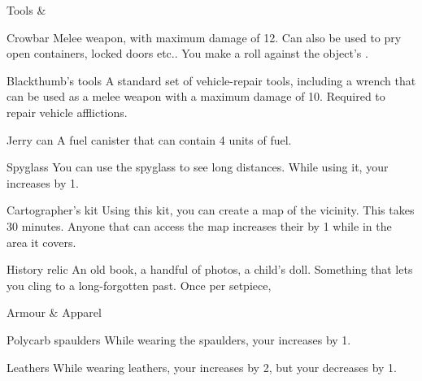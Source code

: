 \begin{abstractsection}{Tools \& }
\vspace{1ex}

\begin{describe}{Crowbar}
  Melee weapon, with maximum damage of 12. Can also be used to pry open containers, locked doors etc.. You make a  roll against the object's .
\end{describe}

\begin{describe}{Blackthumb's tools}
  A standard set of vehicle-repair tools, including a wrench that can be used as a melee weapon with a maximum damage of 10. Required to repair vehicle afflictions.
\end{describe}

\begin{describe}{Jerry can}
  A fuel canister that can contain 4 units of fuel.
\end{describe}

\begin{describe}{Spyglass}
  You can use the spyglass to see long distances. While using it, your  increases by 1.
\end{describe}

\begin{describe}{Cartographer's kit}
  Using this kit, you can create a map of the vicinity. This takes 30 minutes. Anyone that can access the map increases their  by 1 while in the area it covers.
\end{describe}

\begin{describe}{History relic}
  An old book, a handful of photos, a child's doll. Something that lets you cling to a long-forgotten past. Once per setpiece, 
\end{describe}
\end{abstractsection}

\begin{abstractsection}{Armour \& Apparel}
\vspace{1ex}

\begin{describe}{Polycarb spaulders}
  While wearing the spaulders, your  increases by 1.
\end{describe}

\begin{describe}{Leathers}
  While wearing leathers, your  increases by 2, but your  decreases by 1.
\end{describe}
\end{abstractsection}
